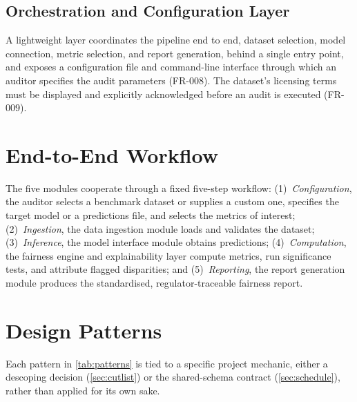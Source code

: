 \subsection{Orchestration and Configuration Layer}
A lightweight layer coordinates the pipeline end to end, dataset selection, model connection, metric selection, and report generation, behind a single entry point, and exposes a configuration file and command-line interface through which an auditor specifies the audit parameters (FR-008). The dataset's licensing terms must be displayed and explicitly acknowledged before an audit is executed (FR-009).

\section{End-to-End Workflow}

The five modules cooperate through a fixed five-step workflow: (1)~\emph{Configuration}, the auditor selects a benchmark dataset or supplies a custom one, specifies the target model or a predictions file, and selects the metrics of interest; (2)~\emph{Ingestion}, the data ingestion module loads and validates the dataset; (3)~\emph{Inference}, the model interface module obtains predictions; (4)~\emph{Computation}, the fairness engine and explainability layer compute metrics, run significance tests, and attribute flagged disparities; and (5)~\emph{Reporting}, the report generation module produces the standardised, regulator-traceable fairness report.

\section{Design Patterns}
\label{sec:patterns}

Each pattern in \cref{tab:patterns} is tied to a specific project mechanic, either a descoping decision (\cref{sec:cutlist}) or the shared-schema contract (\cref{sec:schedule}), rather than applied for its own sake.


